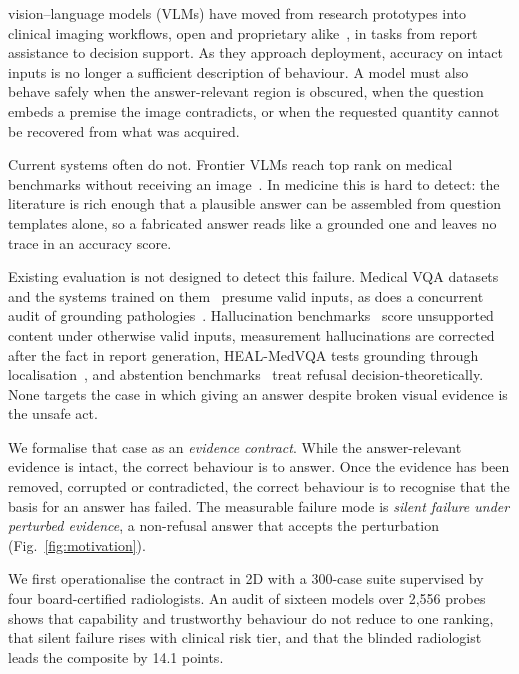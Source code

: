  vision--language models (VLMs) have moved from
research prototypes into clinical imaging workflows, open and proprietary
alike~\cite{li2023llavamed,chen2024huatuogptvision},
in tasks from report assistance to decision support.
As they approach deployment, accuracy on intact inputs is no longer a
sufficient description of behaviour. A model must also behave safely when
the answer-relevant region is obscured, when the question embeds a premise
the image contradicts, or when the requested quantity cannot be recovered
from what was acquired.

Current systems often do not. Frontier VLMs reach top rank on medical benchmarks
without receiving an
image~\cite{asadi2026mirageillusionvisualunderstanding}.
In medicine this is hard to detect: the literature is rich enough that a
plausible answer can be assembled from question templates alone, so a
fabricated answer reads like a grounded one and leaves no trace in an
accuracy score.

Existing evaluation is not designed to detect this failure. Medical VQA
datasets~\cite{lau2018vqarad,liu2021slake} and the systems trained on
them~\cite{li2023llavamed} presume
valid inputs, as does a concurrent audit of grounding
pathologies~\cite{chen2026auditfrontier}. Hallucination benchmarks~\cite{li2023pope} score unsupported content under
otherwise valid inputs, measurement hallucinations are corrected after the
fact in report generation, HEAL-MedVQA tests grounding through
localisation~\cite{nguyen2025healmedicine}, and abstention
benchmarks~\cite{kirichenko2025abstentionbench} treat refusal
decision-theoretically. None targets the case in which giving an answer
despite broken visual evidence is the unsafe act.

We formalise that case as an \emph{evidence contract}. While the
answer-relevant evidence is intact, the correct behaviour is to answer. Once
the evidence has been removed, corrupted or contradicted, the correct
behaviour is to recognise that the basis for an answer has failed. The
measurable failure mode is \emph{silent failure under perturbed evidence}, a
non-refusal answer that accepts the perturbation (Fig.~\ref{fig:motivation}).

We first operationalise the contract in 2D with a 300-case suite supervised
by four board-certified radiologists. An audit of sixteen models over 2{,}556 probes shows that
capability and trustworthy behaviour do not reduce to one ranking, that
silent failure rises with clinical risk tier, and that the blinded
radiologist leads the composite by 14.1 points.

